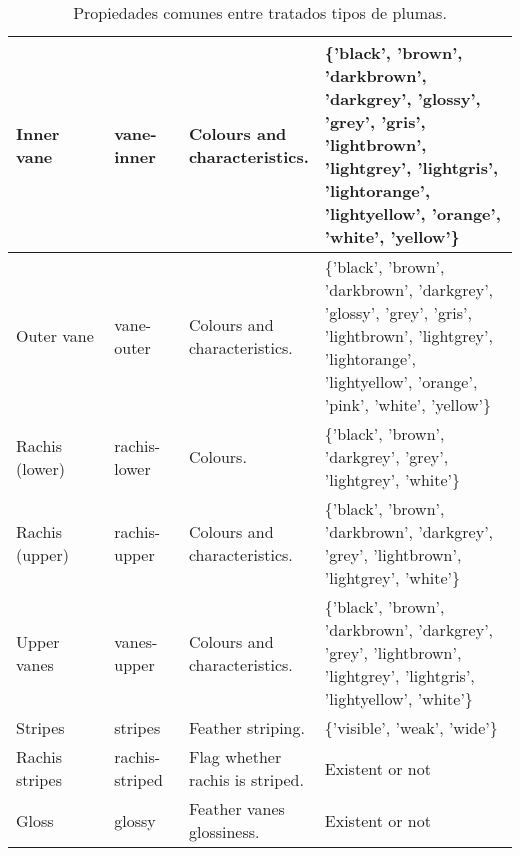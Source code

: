 \documentclass[a4paper,12pt]{article}
\begin{document}
\begin{table}[H]
\begin{tabular}{|p{0.2\linewidth}|p{0.15\linewidth}|p{0.25\linewidth}|p{0.4\linewidth}|}
		Inner vane     & vane-inner   & Colours and characteristics.                  & \small \{'black', 'brown', 'darkbrown', 'darkgrey', 'glossy', 'grey', 'gris', 'lightbrown', 'lightgrey', 'lightgris', 'lightorange', 'lightyellow', 'orange', 'white', 'yellow'\} \\ \hline
		Outer vane     & vane-outer   & Colours and characteristics.                  & \small \{'black', 'brown', 'darkbrown', 'darkgrey', 'glossy', 'grey', 'gris', 'lightbrown', 'lightgrey', 'lightorange', 'lightyellow', 'orange', 'pink', 'white', 'yellow'\}      \\ \hline
		Rachis (lower) & rachis-lower & Colours.                                      & \small \{'black', 'brown', 'darkgrey', 'grey', 'lightgrey', 'white'\}                                                                                                                                                       \\ \hline
		Rachis (upper) & rachis-upper & Colours and characteristics.                  & \small \{'black', 'brown', 'darkbrown', 'darkgrey', 'grey', 'lightbrown', 'lightgrey', 'white'\}                                                                                                                            \\ \hline
		Upper vanes    & vanes-upper  & Colours and characteristics.                  & \small \{'black', 'brown', 'darkbrown', 'darkgrey', 'grey', 'lightbrown', 'lightgrey', 'lightgris', 'lightyellow', 'white'\} \\ \hline
		Stripes & stripes & Feather striping. & \{'visible', 'weak', 'wide'\} \\ \hline
		Rachis stripes & rachis-striped & Flag whether rachis is striped. & Existent or not \\ \hline
		Gloss & glossy & Feather vanes glossiness. & Existent or not \\ \hline
	\end{tabular}
	\caption{Propiedades comunes entre tratados tipos de plumas.}
\end{table}
\end{document}
